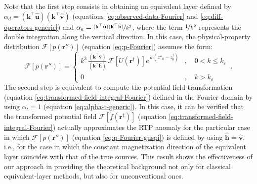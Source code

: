 Note that the first step consists in obtaining an equivalent layer defined by 
$\alpha_{d} = (\mathbf{k}^{\top} \hat{\mathbf{u}}) (\mathbf{k}^{\top} \hat{\mathbf{v}})$ (equations \ref{eq:observed-data-Fourier} 
and \ref{eq:diff-operators-generic}) and 
$\alpha_{a} = \nicefrac{(\mathbf{k}^{\top} \hat{\mathbf{u}}) (\mathbf{k}^{\top} \hat{\mathbf{h}})}{k^{2}}$, 
where the term $\nicefrac{1}{k^{2}}$ represents the double integration along the vertical direction. In this case,  
the physical-property distribution $\mathcal{F} [ p(\mathbf{r}'') ]$ (equation \ref{eq:p-Fourier}) assumes the form:
\begin{equation}
	\mathcal{F} [ p(\mathbf{r}'') ] =
	\begin{cases}
		k^{3} \, \tfrac{\left(\mathbf{k}^{\top} \hat{\mathbf{v}} \right)}{\left(\mathbf{k}^{\top} \hat{\mathbf{h}} \right)} \,
		\mathcal{F} \left[ U(\mathbf{r}^{\dagger}) \right] 
		e^{\, k \, (z''_{0} - z^{\dagger}_{0})} & , 
		\quad 0 < k \le k_{\varepsilon} \\
		0 & , \quad k > k_{\varepsilon} 
	\end{cases} \: .
	\label{eq:p-Fourier-guspi}
\end{equation}
The second step is equivalent to compute the potential-field transformation (equation \ref{eq:transformed-field-integral-Fourier}) 
defined in the Fourier domain by using $\alpha_{t} = 1$ (equation \ref{eq:alpha-t-generic}).
In this case, it can be verified that the transformed potential field $\mathcal{F} [ f(\mathbf{r}^{\ddagger}) ]$ 
(equation \ref{eq:transformed-field-integral-Fourier}) actually approximates the RTP anomaly for the particular case 
in which $\mathcal{F} [ p(\mathbf{r}'') ]$ (equation \ref{eq:p-Fourier-guspi}) is defined by using $\hat{\mathbf{h}} = \hat{\mathbf{v}}$, 
i.e., for the case in which the constant magnetization direction of the equivalent layer coincides with that of the true sources.
This result shows the effectiveness of our approach in providing the theoretical background not only for classical 
equivalent-layer methods, but also for unconventional ones.